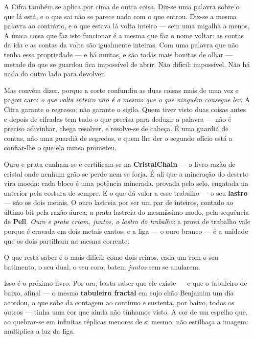 \documentclass[livro.tex]{subfiles}
\begin{document}
A Cifra também se aplica por cima de outra coisa. Diz-se uma palavra sobre o que lá está, e o
que sai não se parece nada com o que entrou. Diz-se a mesma palavra ao contrário, e o que estava
lá volta inteiro --- sem uma migalha a menos. A única coisa que faz isto funcionar é a mesma que
faz o nome voltar: as contas da ida e as contas da volta são igualmente inteiras. Com uma palavra
que não tenha essa propriedade --- e há muitas, e são todas mais bonitas de olhar --- metade do
que se guardou fica impossível de abrir. Não difícil: impossível. Não há nada do outro lado para
devolver.

\medskip

Mas convém dizer, porque a corte confundiu as duas coisas mais de uma vez e pagou caro: \emph{o que
volta inteiro não é o mesmo que o que ninguém consegue ler}. A Cifra garante o regresso; não
garante o sigilo. Quem tiver visto duas coisas antes e depois de cifradas tem tudo o que precisa
para deduzir a palavra --- não é preciso adivinhar, chega resolver, e resolve-se de cabeça. É uma
guardiã de contas, não uma guardiã de segredos, e quem lhe der o segundo ofício está a confiar-lhe
o que ela nunca prometeu.

\medskip

Ouro e prata cunham-se e certificam-se na \textbf{CristalChain} --- o livro-razão de
cristal onde nenhum grão se perde nem se forja. É ali que a mineração do deserto vira
moeda: cada bloco é uma potência minerada, provada pelo selo,
engatada na anterior pela costura de sempre. E o que dá valor a esse trabalho --- o
seu \textbf{lastro} --- são os dois metais. O ouro lastreia por ser um par de
inteiros, contado ao último bit pela razão áurea;
a prata lastreia do mesmíssimo modo, pela sequência de \textbf{Pell}.
\emph{Ouro e prata criam, juntos, o lastro do trabalho}: a prova de trabalho vale
porque é cravada em dois metais exatos, e a liga --- o ouro branco --- é a unidade que
os dois partilham na mesma corrente.

\medskip

O que resta saber é o mais difícil: como dois reinos, cada um com o seu batimento, o
seu dual, o seu coro, batem \emph{juntos} sem se anularem.

\medskip

Isso é o próximo livro. Por ora, basta saber que ele existe --- e que o tabuleiro de
baixo, afinal --- o mesmo \textbf{tabuleiro fractal} em cujo chão Benjamim um dia
acordou, o que sobe da contagem ao contínuo e sustenta, por baixo, todos os outros ---
tinha uma cor que ainda não tínhamos visto. A cor de um espelho que, ao quebrar-se em
infinitas réplicas menores de si mesmo, não estilhaça a imagem: multiplica a luz da liga.
\end{document}
